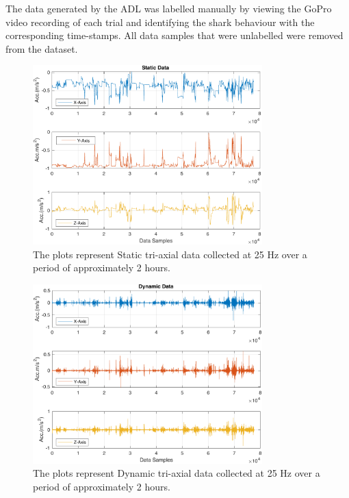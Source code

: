 \documentclass[conference]{IEEEtran}
\begin{document}
The data generated by the ADL was labelled manually by viewing the GoPro video recording of each trial and identifying the shark behaviour with the corresponding time-stamps. All data samples that were unlabelled were removed from the dataset. 
\begin{figure}[h]
	\centering
	\includegraphics[width=3.49in]{1_static.pdf}
	\caption{The plots represent Static tri-axial data collected at 25 Hz over a period of approximately 2 hours.}
	\label{static}
\end{figure}
\begin{figure}[h]
	\centering
	\includegraphics[width=3.49in]{2_dynamic.pdf}
	\caption{The plots represent Dynamic tri-axial data collected at 25 Hz over a period of approximately 2 hours.}
	\label{dynamic}
\end{figure}
\end{document}
